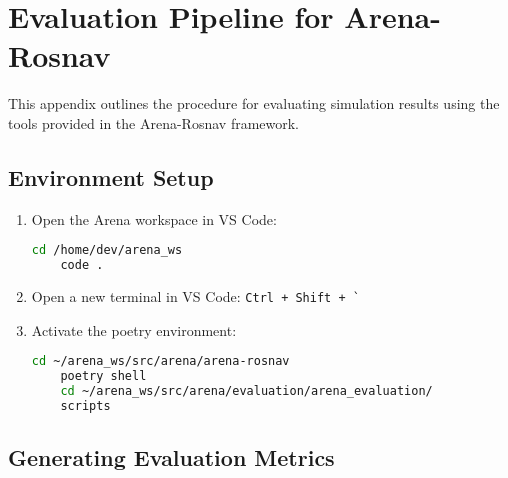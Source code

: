 \chapter{Evaluation Pipeline for Arena-Rosnav}
\label{appendix:evaluation}

This appendix outlines the procedure for evaluating simulation results using the tools provided in the Arena-Rosnav framework.
\section{Environment Setup}

\begin{enumerate}
  \item Open the Arena workspace in VS Code:
  
  \begin{lstlisting}[language=bash]
    cd /home/dev/arena_ws
    code .
  \end{lstlisting}

  \item Open a new terminal in VS Code: \texttt{Ctrl + Shift + \`}

  \item Activate the poetry environment:
  
  \begin{lstlisting}[language=bash]
    cd ~/arena_ws/src/arena/arena-rosnav
    poetry shell
    cd ~/arena_ws/src/arena/evaluation/arena_evaluation/
    scripts
  \end{lstlisting}
\end{enumerate}


\section{Generating Evaluation Metrics}

